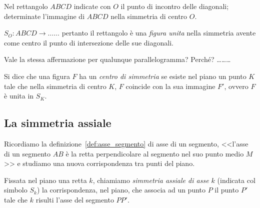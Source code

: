 \begin{exrig}
\begin{esempio}
Nel rettangolo $ABCD$ indicate con $O$ il punto di incontro delle 
diagonali; determinate l'immagine di $ABCD$ nella simmetria di centro 
$O$.

$S_O:ABCD \rightarrow \ldots\ldots{}$ pertanto il rettangolo è una 
\emph{figura unita} nella simmetria avente come centro il punto di 
intersezione delle sue diagonali.

\begin{figure*}[!htb]
    \centering
\end{figure*}

Vale la stessa affermazione per qualunque parallelogramma? Perché? 
\ldots\ldots\ldots{}

\begin{figure*}[!htb]
    \centering
\end{figure*}

\end{esempio}
\end{exrig}

\begin{definizione}
Si dice che una figura $F$ ha un \emph{centro di simmetria} se esiste 
nel piano un punto $K$ tale che nella simmetria di centro $K$, $F$ 
coincide con la sua immagine $F'$, ovvero $F$ è unita in $S_K$. 
\end{definizione}

\subsection{La simmetria assiale}

\noindent\begin{minipage}{0.65\textwidth}\parindent15pt

Ricordiamo la definizione~\ref{def:asse_segmento} di asse di un 
segmento, <<l'asse di un segmento $AB$ è la retta perpendicolare al 
segmento nel suo punto medio $M$>> e studiamo una nuova 
corrispondenza tra punti del piano.
\end{minipage}\hfill
\begin{minipage}{0.25\textwidth}
  \centering 
\end{minipage}
\begin{definizione}
Fissata nel piano una retta $k$, chiamiamo \emph{simmetria assiale di 
asse $k$} (indicata col simbolo $S_k$) la corrispondenza, nel piano, 
che associa ad un punto $P$ il punto $P'$ tale che $k$ risulti l'asse 
del segmento $PP'$.
\end{definizione}


